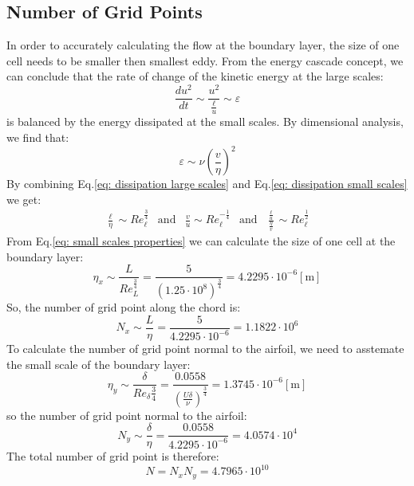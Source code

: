 \documentclass[11pt, a4paper]{article}
\begin{document}
\subsection{Number of Grid Points}
In order to accurately calculating the flow at the boundary layer, the size of one cell needs to be smaller then smallest eddy.
From the energy cascade concept, we can conclude that the rate of change of the kinetic energy at the large scales:
\begin{equation}
    \frac{du^2}{dt}\sim\frac{u^2}{\displaystyle\frac{\ell}{u}}\sim\varepsilon
    \label{eq: dissipation large scales}
\end{equation}
is balanced by the energy dissipated at the small scales. By dimensional analysis, we find that:
\begin{equation}
    \varepsilon\sim\nu\left(\frac{v}{\eta}\right)^2
    \label{eq: dissipation small scales}
\end{equation}
By combining Eq.\ref{eq: dissipation large scales} and Eq.\ref{eq: dissipation small scales} we get:
\begin{equation}
    \begin{matrix}
        \displaystyle\frac{\ell}{\eta}\sim{Re}_\ell^\frac{3}{4} & \text{and} & \displaystyle\frac{v}{u}\sim{Re}_\ell^{-\frac{1}{4}} & \text{and} & \displaystyle\frac{\displaystyle \frac{\ell}{u}}{\displaystyle \frac{\eta}{v}}\sim{Re}_\ell^\frac{1}{2}
        \label{eq: small scales properties}
    \end{matrix}
\end{equation}
From Eq.\ref{eq: small scales properties} we can calculate the size of one cell at the boundary layer:
\begin{equation}
    \eta_x\sim\frac{L}{{Re}_L^\frac{3}{4}}=\frac{5}{\left(1.25\cdot10^8\right)^\frac{3}{4}}=4.2295\cdot10^{-6}\left[\mathrm{m}\right]
\end{equation}
So, the number of grid point along the chord is:
\begin{equation}
    N_x\sim\frac{L}{\eta}=\frac{5}{4.2295\cdot10^{-6}}=1.1822\cdot10^{6}
\end{equation}
To calculate the number of grid point normal to the airfoil, we need to asstemate the small scale of the boundary layer:
\begin{equation}
    \eta_y\sim\frac{\delta}{{Re}_\delta\frac{3}{4}}=\frac{0.0558}{\left(\frac{U\delta}{\nu}\right)^\frac{3}{4}}=1.3745\cdot10^{-6}\left[\mathrm{m}\right]
\end{equation}
so the number of grid point normal to the airfoil:
\begin{equation}
    N_y\sim\frac{\delta}{\eta}=\frac{0.0558}{4.2295\cdot10^{-6}}=4.0574\cdot10^{4}
\end{equation}
The total number of grid point is therefore:
\begin{equation}
    N=N_xN_y=\boxed{4.7965\cdot10^{10}}
\end{equation}
\end{document}
